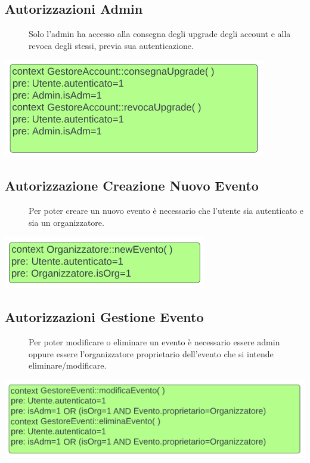 \documentclass{article}
\begin{document}
\subsection{Autorizzazioni Admin}
\begin{description}
    \item[] Solo l'admin ha accesso alla consegna degli upgrade degli account e alla revoca degli stessi, previa sua autenticazione.
\end{description}
\begin{center}
    \item[] \includegraphics[scale=0.4]{oclAdmin.png}
\end{center}
\subsection{Autorizzazione Creazione Nuovo Evento}
\begin{description}
    \item[] Per poter creare un nuovo evento è necessario che l'utente sia autenticato e sia un organizzatore.
\end{description}
\begin{center}
    \item[] \includegraphics[scale=0.4]{oclNewEvento.png}
\end{center}
\subsection{Autorizzazioni Gestione Evento}
\begin{description}
    \item[] Per poter modificare o eliminare un evento è necessario essere admin oppure essere l'organizzatore proprietario dell'evento che si intende eliminare/modificare.
\end{description}
\begin{center}
    \item[] \includegraphics[scale=0.4]{oclGestioneEvento.png}
\end{center}
\end{document}
